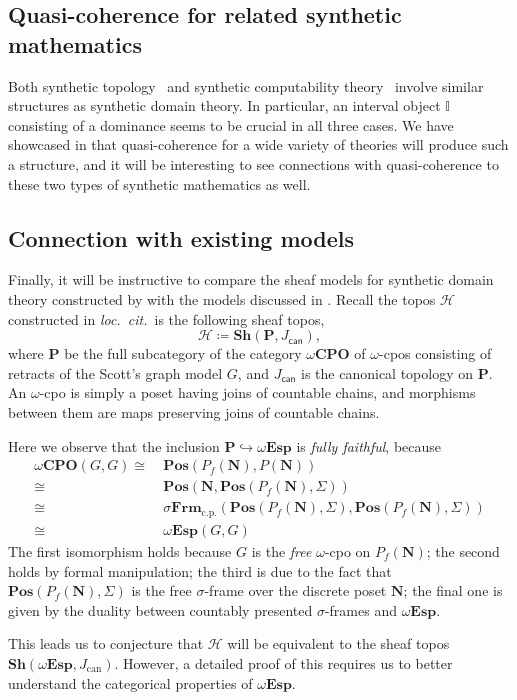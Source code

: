 \documentclass[a4paper,12pt]{amsart}
\theoremstyle{definition}
\newcommand{\mc}[1]{\mathcal{#1}}
\newcommand{\mb}[1]{\mathbf{#1}}
\newcommand{\mbb}[1]{\mathbb{#1}}
\newcommand{\I}{\mbb I}
\newcommand{\mr}[1]{\mathrm{#1}}
\newcommand{\ms}[1]{\mathsf{#1}}
\newcommand{\Pos}{\mb{Pos}}
\newcommand{\sh}{\mb{Sh}}
\newcommand{\hook}{\hookrightarrow}
\newcommand{\cp}{_{\mr{c.p.}}}
\newcommand{\N}{\mb N}
\newcommand{\wCPO}{\omega\mb{CPO}}
\newcommand{\sFrm}{\sigma\mb{Frm}}
\newcommand{\wTop}{\omega\mb{Esp}}
\begin{document}

\subsection{Quasi-coherence for related synthetic mathematics}

Both synthetic topology~\cite{bauer2009dedekind} and synthetic computability theory~\cite{RN552} involve similar structures as synthetic domain theory. In particular, an interval object $\I$ consisting of a dominance seems to be crucial in all three cases. We have showcased in  that quasi-coherence for a wide variety of theories will produce such a structure, and it will be interesting to see connections with quasi-coherence to these two types of synthetic mathematics as well.

\subsection{Connection with existing models}\label{subsec:compare}

Finally, it will be instructive to compare the sheaf models for synthetic domain theory constructed by \citet{FIORE1997151} with the models discussed in . Recall the topos $\mc H$ constructed in \emph{loc.\ cit.}\ is the following sheaf topos,
\[ \mc H \coloneq \sh(\mb P,J_{\ms{can}}), \]
where $\mb P$ be the full subcategory of the category $\wCPO$ of $\omega$-cpos consisting of retracts of the Scott's graph model $G$, and $J_{\ms{can}}$ is the canonical topology on $\mb P$. An $\omega$-cpo is simply a poset having joins of countable chains, and morphisms between them are maps preserving joins of countable chains.

Here we observe that the inclusion $\mb P \hook \wTop$ is \emph{fully faithful}, because
\begin{align*}
  \wCPO(G,G)
  \cong\ & \Pos(P_f(\N),P(\N)) \\
  \cong\ & \Pos(\N,\Pos(P_f(\N),\Sigma)) \\
  \cong\ & \sFrm\cp(\Pos(P_f(\N),\Sigma),\Pos(P_f(\N),\Sigma)) \\ 
  \cong\ & \wTop(G,G)
\end{align*}
The first isomorphism holds because $G$ is the \emph{free} $\omega$-cpo on $P_f(\N)$; the second holds by formal manipulation; the third is due to the fact that $\Pos(P_f(\N),\Sigma)$ is the free $\sigma$-frame over the discrete poset $\N$; the final one is given by the duality between countably presented $\sigma$-frames and $\wTop$. 

This leads us to conjecture that $\mc H$ will be equivalent to the sheaf topos $\sh(\wTop,J_{\mr{can}})$. However, a detailed proof of this requires us to better understand the categorical properties of $\wTop$.

 

\end{document}
